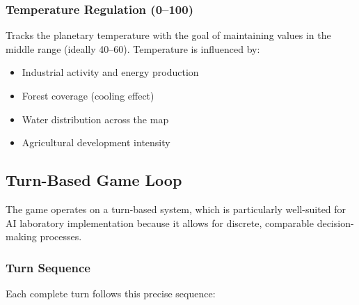 \documentclass[12pt,a4paper]{article}
\begin{document}
\subsubsection{Temperature Regulation (0--100)}

Tracks the planetary temperature with the goal of maintaining values in the middle range (ideally 40--60). Temperature is influenced by:
\begin{itemize}
    \item Industrial activity and energy production
    \item Forest coverage (cooling effect)
    \item Water distribution across the map
    \item Agricultural development intensity
\end{itemize}

\subsection{Turn-Based Game Loop}

The game operates on a turn-based system, which is particularly well-suited for AI laboratory implementation because it allows for discrete, comparable decision-making processes.

\subsubsection{Turn Sequence}

Each complete turn follows this precise sequence:
\end{document}
